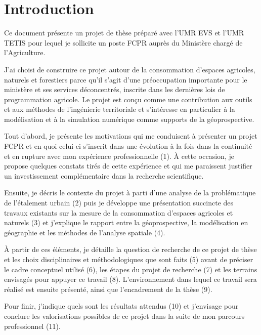 \section
{Introduction}

Ce document présente un projet de thèse préparé avec l’UMR EVS et l’UMR TETIS
pour lequel je sollicite un poste FCPR auprès du Ministère chargé de
l’Agriculture.

J’ai choisi de construire ce projet autour de la consommation d’espaces
agricoles, naturels et forestiers parce qu’il s’agit d’une préoccupation
importante pour le ministère et ses services déconcentrés, inscrite dans les
dernières lois de programmation agricole. Le projet est conçu comme une
contribution aux outils et aux méthodes de l’ingénierie territoriale et
s’intéresse en particulier à la modélisation et à la simulation numérique
comme supports de la géoprospective.

Tout d’abord, je présente les motivations qui me conduisent à présenter un
projet FCPR et en quoi celui-ci s’inscrit dans une évolution à la fois dans la
continuité et en rupture avec mon expérience professionnelle (1). À cette
occasion, je propose quelques constats tirés de cette expérience et qui me
paraissent justifier un investissement complémentaire dans la recherche
scientifique.

Ensuite, je décris le contexte du projet à parti d’une analyse de la
problématique de l’étalement urbain (2) puis je développe une présentation
succincte des travaux existants sur la mesure de la consommation d’espaces
agricoles et naturels (3) et j’explique le rapport entre la géoprospective, la
modélisation en géographie et les méthodes de l’analyse spatiale (4).

À partir de ces éléments, je détaille la question de recherche de ce projet de
thèse et les choix disciplinaires et méthodologiques que sont faits (5) avant
de préciser le cadre conceptuel utilisé (6), les étapes du projet de recherche
(7) et les terrains envisagés pour appuyer ce travail (8). L’environnement
dans lequel ce travail sera réalisé est ensuite présenté, ainsi que
l’encadrement de la thèse (9).

Pour finir, j’indique quels sont les résultats attendus (10) et j’envisage
pour conclure les valorisations possibles de ce projet dans la suite de mon
parcours professionnel (11).